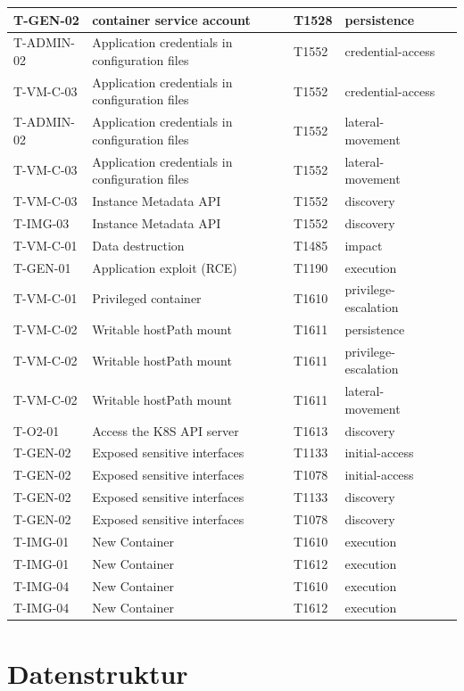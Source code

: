 \begin{longtable}{|l|l|l|l|l|}
T-GEN-02 & container service account & T1528 & persistence \\ \hline
T-ADMIN-02 & Application credentials in configuration files & T1552 & credential-access \\ \hline
T-VM-C-03 & Application credentials in configuration files & T1552 & credential-access \\ \hline
T-ADMIN-02 & Application credentials in configuration files & T1552 & lateral-movement \\ \hline
T-VM-C-03 & Application credentials in configuration files & T1552 & lateral-movement \\ \hline
T-VM-C-03 & Instance Metadata API & T1552 & discovery \\ \hline
T-IMG-03 & Instance Metadata API & T1552 & discovery \\ \hline
T-VM-C-01 & Data destruction & T1485 & impact \\ \hline
T-GEN-01 & Application exploit (RCE) & T1190 & execution \\ \hline
T-VM-C-01 & Privileged container & T1610 & privilege-escalation \\ \hline
T-VM-C-02 & Writable hostPath mount & T1611 & persistence \\ \hline
T-VM-C-02 & Writable hostPath mount & T1611 & privilege-escalation \\ \hline
T-VM-C-02 & Writable hostPath mount & T1611 & lateral-movement \\ \hline
T-O2-01 & Access the K8S API server & T1613 & discovery \\ \hline
T-GEN-02 & Exposed sensitive interfaces & T1133 & initial-access \\ \hline
T-GEN-02 & Exposed sensitive interfaces & T1078 & initial-access \\ \hline
T-GEN-02 & Exposed sensitive interfaces & T1133 & discovery \\ \hline
T-GEN-02 & Exposed sensitive interfaces & T1078 & discovery \\ \hline
T-IMG-01 & New Container & T1610 & execution \\ \hline
T-IMG-01 & New Container & T1612 & execution \\ \hline
T-IMG-04 & New Container & T1610 & execution \\ \hline
T-IMG-04 & New Container & T1612 & execution \\ \hline
\end{longtable}
\restoregeometry


\chapter{Datenstruktur}
\label{app:db-schema}

